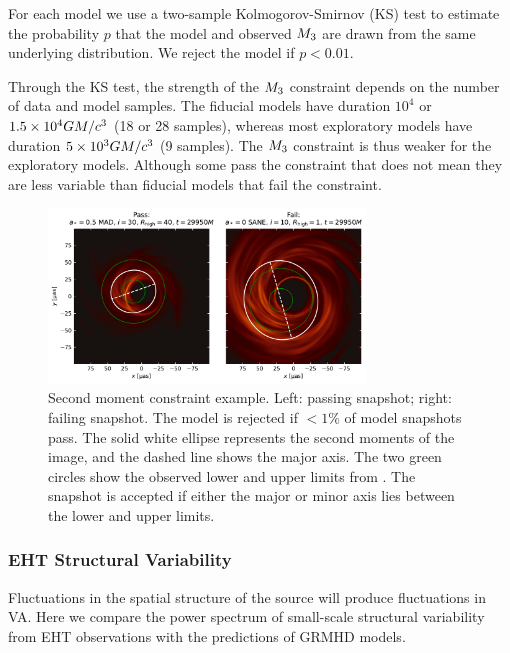 For each model we use a two-sample Kolmogorov-Smirnov (KS) test to estimate the probability $p$ that the model and observed $M_{3}$ are drawn from the same underlying distribution.  We reject the model if $p < 0.01$.

Through the KS test, the strength of the $M_{3}$ constraint depends on the number of data and model samples.  The fiducial models have duration $10^4$ or $1.5\times 10^4 GM/c^3$ (18 or 28 samples), whereas most exploratory models have duration $5 \times 10^3 GM/c^3$ (9 samples). The $M_{3}$ constraint is thus weaker for the exploratory models.  Although some pass the constraint that does not mean they are less variable than fiducial models that fail the constraint.

\begin{figure}
  \centering
  \includegraphics[width=0.75\textwidth]{figures/passfail_sz.pdf}
  \caption{Second moment constraint example.  Left: passing snapshot; right: failing snapshot.  The model is rejected if $< 1\%$ of model snapshots pass. The solid white ellipse  represents the second moments of the image, and the dashed line shows the major axis.  The two green circles show the observed lower and upper limits from . The snapshot is accepted if either the major or minor axis lies between the lower and upper limits.
  }
  \label{fig:passfail_sz}
\end{figure}

\subsubsection{EHT Structural Variability}

Fluctuations in the spatial structure of the source will produce fluctuations in VA.  Here we compare  the power spectrum of small-scale structural variability from EHT observations with the predictions of GRMHD models.

